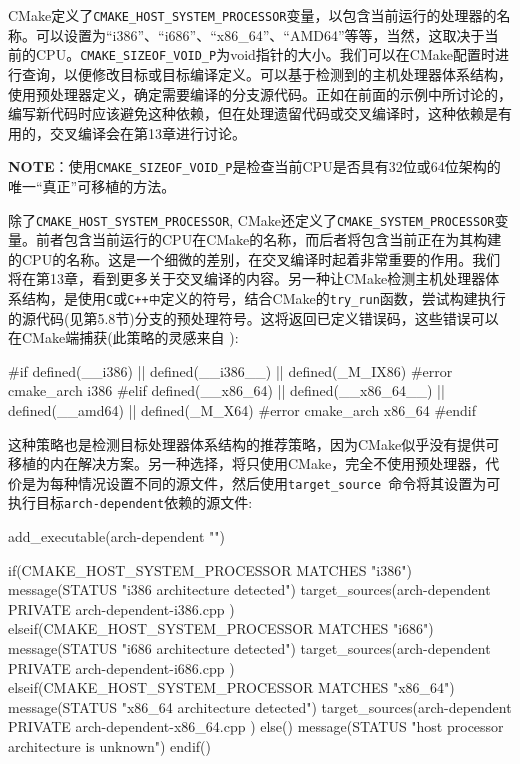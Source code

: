 
CMake定义了\texttt{CMAKE\_HOST\_SYSTEM\_PROCESSOR}变量，以包含当前运行的处理器的名称。可以设置为“i386”、“i686”、“x86\_64”、“AMD64”等等，当然，这取决于当前的CPU。\texttt{CMAKE\_SIZEOF\_VOID\_P}为void指针的大小。我们可以在CMake配置时进行查询，以便修改目标或目标编译定义。可以基于检测到的主机处理器体系结构，使用预处理器定义，确定需要编译的分支源代码。正如在前面的示例中所讨论的，编写新代码时应该避免这种依赖，但在处理遗留代码或交叉编译时，这种依赖是有用的，交叉编译会在第13章进行讨论。

\begin{myInfoBox}
\textbf{NOTE}：使用\texttt{CMAKE\_SIZEOF\_VOID\_P}是检查当前CPU是否具有32位或64位架构的唯一“真正”可移植的方法。
\end{myInfoBox}


除了\texttt{CMAKE\_HOST\_SYSTEM\_PROCESSOR}, CMake还定义了\texttt{CMAKE\_SYSTEM\_PROCESSOR}变量。前者包含当前运行的CPU在CMake的名称，而后者将包含当前正在为其构建的CPU的名称。这是一个细微的差别，在交叉编译时起着非常重要的作用。我们将在第13章，看到更多关于交叉编译的内容。另一种让CMake检测主机处理器体系结构，是使用\texttt{C}或\texttt{C++中}定义的符号，结合CMake的\texttt{try\_run}函数，尝试构建执行的源代码(见第5.8节)分支的预处理符号。这将返回已定义错误码，这些错误可以在CMake端捕获(此策略的灵感来自  ):

\begin{codebox}[cpp]
#if defined(__i386) || defined(__i386__) || defined(_M_IX86)
    #error cmake_arch i386
#elif defined(__x86_64) || defined(__x86_64__) || defined(__amd64) || defined(_M_X64)
    #error cmake_arch x86_64
#endif
\end{codebox}

这种策略也是检测目标处理器体系结构的推荐策略，因为CMake似乎没有提供可移植的内在解决方案。另一种选择，将只使用CMake，完全不使用预处理器，代价是为每种情况设置不同的源文件，然后使用\texttt{target\_source }命令将其设置为可执行目标\texttt{arch-dependent}依赖的源文件:

\begin{codebox}[cmake]
add_executable(arch-dependent "")

if(CMAKE_HOST_SYSTEM_PROCESSOR MATCHES "i386")
    message(STATUS "i386 architecture detected")
    target_sources(arch-dependent
        PRIVATE
        arch-dependent-i386.cpp
    )
elseif(CMAKE_HOST_SYSTEM_PROCESSOR MATCHES "i686")
    message(STATUS "i686 architecture detected")
    target_sources(arch-dependent
        PRIVATE
            arch-dependent-i686.cpp
    )
elseif(CMAKE_HOST_SYSTEM_PROCESSOR MATCHES "x86_64")
    message(STATUS "x86_64 architecture detected")
    target_sources(arch-dependent
        PRIVATE
            arch-dependent-x86_64.cpp
    )
else()
    message(STATUS "host processor architecture is unknown")
endif()
\end{codebox}

